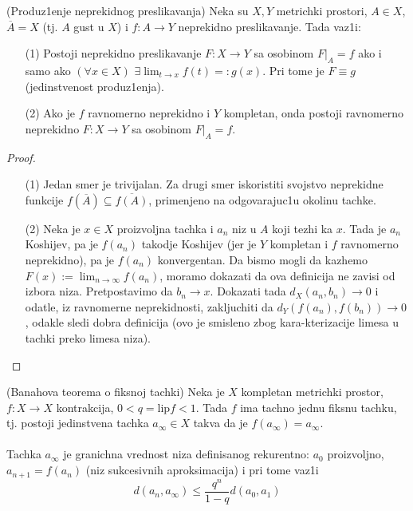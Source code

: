 \documentclass[a4paper,12pt]{article}
\newcommand{\psj}{\subseteq}
\begin{document}
\begin{tma}
(Produz1enje neprekidnog preslikavanja) Neka su $X, Y$ metrichki prostori, $A \in X$, $\overline{A} = X$ (tj. $A$ gust u $X$) i $f: A \to Y$ neprekidno preslikavanje. Tada vaz1i:
\begin{itemize}
\item[(1)] Postoji neprekidno preslikavanje $F: X \to Y$ sa osobinom $F|_{A} = f$ ako i samo ako $(\forall x \in X)$ $\exists \lim_{t \to x} f(t) =: g(x)$. Pri tome je $F \equiv g$ (jedinstvenost produz1enja).
\item[(2)] Ako je $f$ ravnomerno neprekidno i $Y$ kompletan, onda postoji ravnomerno nepre\-kidno $F: X \to Y$ sa osobinom $F|_{A} = f$.
\end{itemize}
\end{tma}
\begin{proof}
\begin{itemize}
	\item[(1)] Jedan smer je trivijalan. Za drugi smer iskoristiti svojstvo neprekidne funkcije $f(\overline{A}) \psj \overline{f(A)}$,
		primenjeno na odgovarajuc1u okolinu tachke.
\item[(2)] Neka je $x\in X$ proizvoljna tachka i $a_n$ niz u $A$ koji tezhi ka $x$. Tada je $a_n$ Koshijev, pa 
	je $f(a_n)$ takodje Koshijev (jer je $Y$ kompletan i $f$ ravnomerno neprekidno), pa je $f(a_n)$ konvergentan.
		Da bismo mogli da kazhemo $F(x):= \lim_{n\to\infty}f(a_n)$, moramo dokazati da ova definicija ne zavisi od izbora
		niza. Pretpostavimo da $b_n\to x$. Dokazati tada $d_X(a_n, b_n)\to 0$ i odatle, iz ravnomerne neprekidnosti, zakljuchiti
		da $d_Y(f(a_n), f(b_n))\to 0$, odakle sledi dobra definicija (ovo je smisleno zbog kara-kterizacije limesa u tachki preko 
		limesa niza).
\end{itemize}

\end{proof}

\begin{tma}
(Banahova teorema o fiksnoj tachki) Neka je $X$ kompletan metrichki prostor, $f: X \to X$ kontrakcija, $0 < q = \mathrm{lip} f < 1$. Tada $f$ ima tachno jednu fiksnu tachku, tj. postoji jedinstvena tachka $a_{\infty} \in X$ takva da je $f(a_{\infty}) = a_{\infty}$.\\ \\
Tachka $a_{\infty}$ je granichna vrednost niza definisanog rekurentno: $a_0$ proizvoljno, $a_{n+1} = f(a_n)$ (niz sukcesivnih aproksimacija) i pri tome vaz1i \[d(a_n, a_{\infty}) \leq \frac{q^n}{1-q} d(a_0, a_1)\]
\end{tma}
\end{document}
